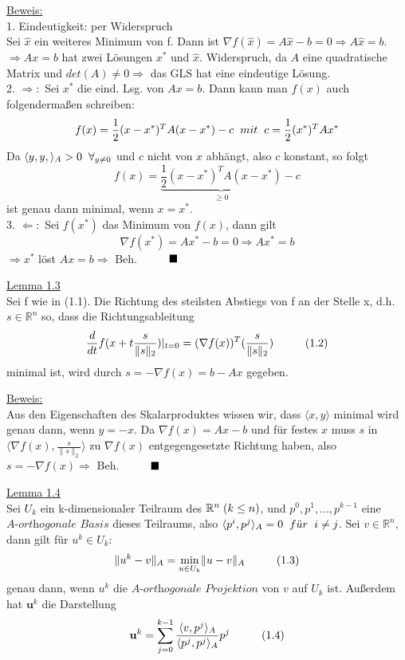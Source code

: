\documentclass[a4paper]{letter}
\begin{document}
\underline{Beweis:}
\\1. Eindeutigkeit: per Widerspruch
\\Sei $\hat x$ ein weiteres Minimum von f. Dann ist $\nabla f(\hat x) = A\hat x - b = 0 \Rightarrow A\hat x = b$.
\\$\Rightarrow Ax = b$ hat zwei L\"osungen $x^{*}$ und $\hat x$. Widerspruch, da $A$ eine quadratische Matrix und $det(A) \ne 0 \Rightarrow $ das GLS hat eine eindeutige L\"osung.
\\2. $\Rightarrow:$ Sei $x^{*}$ die eind. Lsg. von $Ax = b$. Dann kann man $f(x)$ auch folgenderma{\ss}en schreiben:
$$f(x) = \frac 1 2 (x - x^{*})^{T}A(x - x^{*}) - c \hspace{2mm} mit \hspace{2mm} c = \frac 1 2 (x^{*})^{T}Ax^{*}$$
Da $\langle y, y, \rangle _{A} > 0 \hspace{2mm} \forall _{y \ne 0}$ und $c$ nicht von $x$ abh\"angt, also $c$ konstant, so folgt
$$f(x) = \underbrace {\frac 1 2 (x - x^{*})^{T}A(x - x^{*})}_{\ge 0} - c$$
ist genau dann minimal, wenn $x = x^{*}$.
\\3. $\Leftarrow:$ Sei $f(x^{*})$ das Minimum von $f(x)$, dann gilt
$$\nabla f(x^{*}) = Ax^{*} - b = 0 \Rightarrow Ax^{*} = b$$
$\Rightarrow x^{*}$ l\"ost $Ax = b \Rightarrow$ Beh.$\hspace{10mm} \blacksquare$

\underline{Lemma 1.3}
\\Sei f wie in (1.1). Die Richtung des steilsten Abstiegs von f an der Stelle x, d.h. $s\in\mathbb{R}^{n}$ so, dass die Richtungsableitung
$$\frac d {dt} f(x+t\frac s {\|s\|_{2}})|_{t=0} = (\nabla f(x))^{T} (\frac s {\|s\|_{2}}) \hspace{10mm}(1.2)$$
minimal ist, wird durch $s = -\nabla f(x) = b - Ax$ gegeben.

\underline{Beweis:}
\\Aus den Eigenschaften des Skalarproduktes wissen wir, dass $\langle x, y \rangle$ minimal wird genau dann, wenn $y = -x$. Da $\nabla f(x) = Ax - b$ und f\"ur festes $x$ muss $s$ in $\langle {\nabla f(x)}, {\frac s {\|s\|_{2}}} \rangle$ zu $\nabla f(x)$ entgegengesetzte Richtung haben, also $s = -\nabla f(x) \Rightarrow$ Beh.$\hspace{10mm} \blacksquare$

\underline{Lemma 1.4}
\\Sei $U_{k}$ ein k-dimensionaler Teilraum des $\mathbb{R}^{n} \hspace{1mm} (k \le n)$, und $p^{0}, p^{1},...,p^{k-1}$ eine $\textit{A-orthogonale Basis}$ dieses Teilraums, also $\langle p^{i}, p^{j} \rangle _{A} = 0 \hspace{2mm} f\ddot{u}r \hspace{2mm} i \ne j$. Sei $v \in \mathbb{R}^{n}$, dann gilt f\"ur $u^{k} \in U_{k}$:
$$\|u^{k} - v\|_{A} = \underset{u \in U_{k}}{\min} \|u - v\|_{A} \hspace{10mm}(1.3)$$
genau dann, wenn $u^{k}$ die $\textit{A-orthogonale Projektion}$ von $v$ auf $U_{k}$ ist. Au{\ss}erdem hat $\textbf{u}^{k}$ die Darstellung
$$\textbf{u}^{k} = \sum_{j=0}^{k-1} \frac {\langle v, p^{j} \rangle _{A}} {\langle p^{j}, p^{j} \rangle _{A}} p^{j} \hspace{10mm}(1.4)$$
\end{document}

